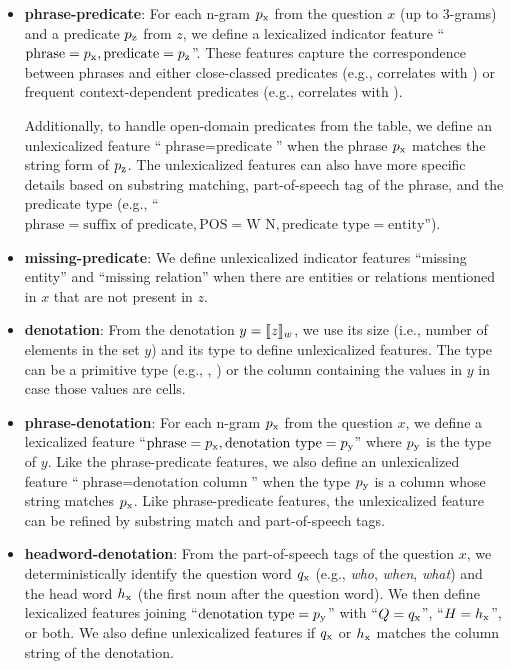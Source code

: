 \begin{itemize}

\item \textbf{phrase-predicate}:
For each n-gram $p_\mathrm{x}$ from the question $x$
(up to 3-grams)
and a predicate $p_\mathrm{z}$ from $z$,
we define a lexicalized
indicator feature
``$\text{phrase} = p_\mathrm{x}, \text{predicate} = p_\mathrm{z}$''.
These features capture the correspondence between
phrases and either close-classed predicates
(e.g.,  correlates with )
or frequent context-dependent predicates
(e.g.,  correlates with ).

Additionally,
to handle open-domain predicates from the table,
we define an unlexicalized feature
``$\text{phrase} = \text{predicate}$''
when the phrase $p_\mathrm{x}$ matches the string form of $p_\mathrm{z}$.
The unlexicalized features can also have more specific details
based on substring matching,
part-of-speech tag of the phrase,
and the predicate type
(e.g., ``$\text{phrase} = \text{suffix of predicate}, \text{POS} = \text{W N}, \text{predicate type} = \text{entity}$'').

\item \textbf{missing-predicate}:
We define unlexicalized indicator features ``missing entity''
and ``missing relation''
when there are entities or relations mentioned in $x$
that are not present in $z$.

\item \textbf{denotation}:
From the denotation $y = \llbracket{z}\rrbracket_{w}$,
we use its size (i.e., number of elements in the set $y$)
and its type to define unlexicalized features.
The type can be a primitive type (e.g., , )
or the column containing the values in $y$
in case those values are cells.

\item \textbf{phrase-denotation}:
For each n-gram $p_\mathrm{x}$ from the question $x$,
we define a lexicalized feature
``$\text{phrase} = p_\mathrm{x}, \text{denotation type} = p_\mathrm{y}$''
where $p_\mathrm{y}$ is the type of $y$.
Like the phrase-predicate features,
we also define an unlexicalized feature
``$\text{phrase} = \text{denotation column}$''
when the type $p_\mathrm{y}$ is a column whose string matches $p_\mathrm{x}$.
Like phrase-predicate features, the unlexicalized feature
can be refined by substring match and part-of-speech tags.

\item \textbf{headword-denotation}:
From the part-of-speech tags of the question $x$,
we deterministically identify the question word $q_\mathrm{x}$
(e.g., \emph{who}, \emph{when}, \emph{what})
and the head word $h_\mathrm{x}$
(the first noun after the question word).
We then define lexicalized features
joining ``$\text{denotation type} = p_\mathrm{y}$''
with ``$Q = q_\mathrm{x}$'', ``$H = h_\mathrm{x}$'', or both.
We also define unlexicalized features if $q_\mathrm{x}$ or $h_\mathrm{x}$
matches the column string of the denotation.

\end{itemize}

